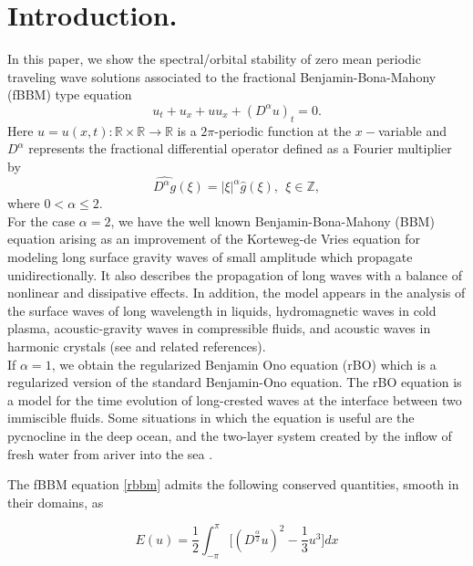 \documentclass[12pt,reqno]{amsart}
\newcommand{\2}{L^2_{per}(0, T)}
\numberwithin{equation}{section}
\numberwithin{figure}{section}
\begin{document}
\section{Introduction.}
In this paper, we show the spectral/orbital stability of zero mean periodic traveling wave solutions associated to the fractional Benjamin-Bona-Mahony (fBBM) type equation
	\begin{equation}\label{rbbm}
	u_t +u_x +uu_x +(D^{\alpha}u)_t=0.
	\end{equation}
Here $u=u(x,t):\mathbb{R \times \mathbb{R} \rightarrow \mathbb{R}}$ is a $2\pi$-periodic function  at the $x-$variable and $D^{\alpha}$ represents the fractional differential operator defined as a Fourier multiplier by
	\begin{equation}\label{fracderivative}
	\widehat{D^{\alpha}g}(\xi)= |\xi|^{\alpha}\widehat{g}(\xi), \ \ \xi \in \mathbb{Z},
	\end{equation}
where $0< \alpha \leq 2$.\\
\indent For the case $\alpha=2$, we have the well known Benjamin-Bona-Mahony (BBM) equation arising as an improvement of the Korteweg-de Vries equation for modeling long surface gravity waves of small amplitude which propagate unidirectionally.
It also describes the propagation of long waves with a balance of nonlinear
and dissipative effects. In addition, the model appears  in the analysis of the surface waves of long wavelength in liquids, hydromagnetic
waves in cold plasma, acoustic-gravity waves in compressible
fluids, and acoustic waves in harmonic crystals (see \cite{BBM} and related references).\\
\indent If $\alpha=1$, we obtain the regularized Benjamin Ono equation (rBO) which is a regularized version of the standard Benjamin-Ono equation. The rBO equation is a model for the time evolution of long-crested waves at the interface between two immiscible fluids. Some situations in which the equation is useful are the pycnocline in the deep ocean, and the two-layer system created by the inflow of fresh water from ariver into the sea \cite{kalisch}.


The fBBM equation \eqref{rbbm} admits the following conserved quantities, smooth in their domains, as

	\begin{equation}\label{quantconserved}
	\displaystyle E(u)= \frac{1}{2}\int_{-\pi}^{\pi}\big[ (D^{\frac{\alpha}{2}}u)^2 - \frac{1}{3}u^3\big] dx
	\end{equation}
	
\end{document}
